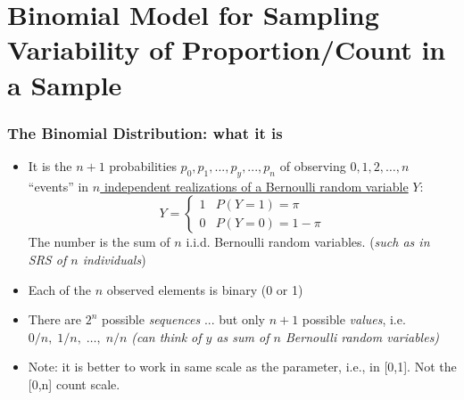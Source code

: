 \documentclass[10pt,handout]{beamer}\usepackage[]{graphicx}\usepackage[]{color}
\begin{document}
\section{Binomial Model for Sampling Variability of Proportion/Count in a Sample}




\begin{frame}
	\frametitle{The Binomial Distribution: what it is}
	\small
	\begin{itemize}
		\setlength\itemsep{0.5em}
		\item It is the $n+1$ probabilities $p_{0}, p_{1}, ..., p_{y}, ..., p_{n}$ of observing 
		$0, 1, 2, \dots , n$ ``events''  in \underline{$n$ independent realizations of a Bernoulli random variable} $Y$:
		$$
		Y = \begin{cases}
		1 & P(Y=1) = \pi \\
		0 & P(Y=0) = 1-\pi
		\end{cases}	
		$$
		The number is the sum of $n$ i.i.d. Bernoulli random variables.	(\emph{such as in SRS of $n$ individuals}) \pause 
		\item Each of the $n$ observed elements is binary (0 or 1) %
		\item There are $2^{n}$ possible \textit{sequences} ... but only $n+1$ possible \textit{values}, 
		i.e. $0/n,\;1/n,\;\dots ,\;n/n$  \emph{(can think of $y$ as sum of $n$ Bernoulli random variables)} 
		\item Note: it is better to work in same scale as the parameter, i.e., in [0,1]. Not the [0,n] count scale.
	\end{itemize}
\end{frame}	
\end{document}
